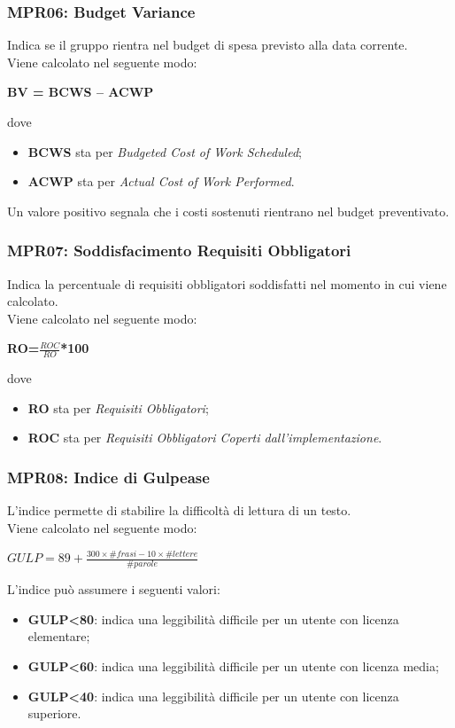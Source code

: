 \subsubsection{MPR06: Budget Variance}
Indica se il gruppo rientra nel budget di spesa previsto alla data corrente.\\
Viene calcolato nel seguente modo:
\begin{center}
	\textbf{BV = BCWS – ACWP}
\end{center}
dove
\begin{itemize}
	\item \textbf{BCWS} sta per \textit{Budgeted Cost of Work Scheduled};
	\item \textbf{ACWP} sta per \textit{Actual Cost of Work Performed}.
\end{itemize}
Un valore positivo segnala che i costi sostenuti rientrano nel budget preventivato.
\subsubsection{MPR07: Soddisfacimento Requisiti Obbligatori}
Indica la percentuale di requisiti obbligatori soddisfatti nel momento in cui viene calcolato.\\
Viene calcolato nel seguente modo:
\begin{center}
	\textbf{RO=\(\frac{ROC}{RO}\)*100}
\end{center}
dove
\begin{itemize}
	\item \textbf{RO} sta per \textit{Requisiti Obbligatori};
	\item \textbf{ROC} sta per \textit{Requisiti Obbligatori Coperti dall'implementazione}.
\end{itemize}
\subsubsection{MPR08: Indice di Gulpease}
L'indice permette di stabilire la difficoltà di lettura di un testo.\\
Viene calcolato nel seguente modo:
\begin{center}
	\(
	GULP = 89+\frac{300\times\# frasi-10\times\#lettere}{\#parole}
	\)
\end{center}
L'indice può assumere i seguenti valori:
\begin{itemize}
	\item \textbf{GULP<80}: indica una leggibilità difficile per un utente con licenza elementare;
	\item \textbf{GULP<60}: indica una leggibilità difficile per un utente con licenza media;
	\item \textbf{GULP<40}: indica una leggibilità difficile per un utente con licenza superiore.
\end{itemize}
